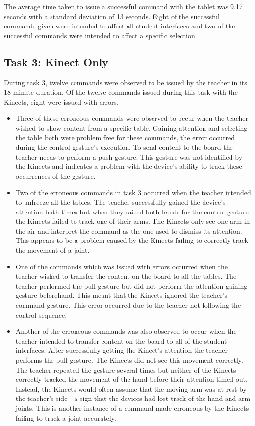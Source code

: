 \documentclass[link]{IWCOMP}
\begin{document}
The average time taken to issue a successful command with the tablet was 9.17 seconds with a standard deviation of 13 seconds.
Eight of the successful commands given were intended to affect all student interfaces and two of the successful commands were intended to affect a specific selection.

\subsection{Task 3: Kinect Only}
\label{subsec:resultsTask3}

During task 3, twelve commands were observed to be issued by the teacher in its 18 minute duration.
Of the twelve commands issued during this task with the Kinects, eight were issued with errors.

\begin{itemize}
\item Three of these erroneous commands were observed to occur when the teacher wished to show content from a specific table.
Gaining attention and selecting the table both were problem free for these commands, the error occurred during the control gesture's execution.
To send content to the board the teacher needs to perform a push gesture.
This gesture was not identified by the Kinects and indicates a problem with the device's ability to track these occurrences of the gesture.

\item Two of the erroneous commands in task 3 occurred when the teacher intended to unfreeze all the tables.
The teacher successfully gained the device's attention both times but when they raised both hands for the control gesture the Kinects failed to track one of their arms.
The Kinects only see one arm in the air and interpret the command as the one used to dismiss its attention.
This appears to be a problem caused by the Kinects failing to correctly track the movement of a joint.

\item One of the commands which was issued with errors occurred when the teacher wished to transfer the content on the board to all the tables.
The teacher performed the pull gesture but did not perform the attention gaining gesture beforehand.
This meant that the Kinects ignored the teacher's command gesture.
This error occurred due to the teacher not following the control sequence.

\item Another of the erroneous commands was also observed to occur when the teacher intended to transfer content on the board to all of the student interfaces.
After successfully getting the Kinect's attention the teacher performs the pull gesture.
The Kinects did not see this movement correctly.
The teacher repeated the gesture several times but neither of the Kinects correctly tracked the movement of the hand before their attention timed out.
Instead, the Kinects would often assume that the moving arm was at rest by the teacher's side - a sign that the devices had lost track of the hand and arm joints.
This is another instance of a command made erroneous by the Kinects failing to track a joint accurately.


\end{itemize}
\end{document}
